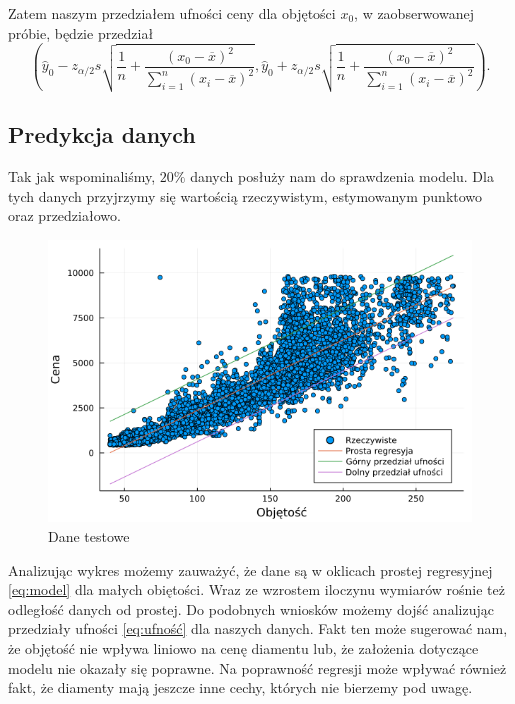 \documentclass[12pt]{article}
\theoremstyle{exer}
\begin{document}
	\noindent Zatem naszym przedziałem ufności ceny dla objętości $x_0$, w zaobserwowanej próbie, będzie przedział
	\begin{equation}\label{eq:ufność}
		\left(\hat y_0 - 	z_{\alpha/2}s\sqrt{\frac{1}{n}+\frac{\left(x_0-\overline{x}\right)^2}{\sum_{i=1}^n\left(x_i-\overline{x}\right)^2}}, \hat y_0 + z_{\alpha/2}s\sqrt{\frac{1}{n}+\frac{\left(x_0-\overline{x}\right)^2}{\sum_{i=1}^n\left(x_i-\overline{x}\right)^2}}\right).
	\end{equation}
     
     \subsection{Predykcja danych}
     Tak jak wspominaliśmy, $ 20\% $ danych posłuży nam do sprawdzenia modelu. Dla tych danych przyjrzymy się wartością rzeczywistym, estymowanym punktowo oraz przedziałowo.
     
     
	\begin{figure}[H]
	\centering
	\includegraphics[width=7\columnwidth/10]{images/prediction.png}
	\caption{Dane testowe}
	\label{fig:prediction}
\end{figure}
Analizując wykres możemy zauważyć, że dane są w oklicach prostej regresyjnej \eqref{eq:model} dla małych obiętości. Wraz ze wzrostem iloczynu wymiarów rośnie też odległość danych od prostej. Do podobnych wniosków możemy dojść analizując przedziały ufności \eqref{eq:ufność} dla naszych danych. Fakt ten może sugerować nam, że objętość nie wpływa liniowo na cenę diamentu lub, że założenia dotyczące modelu nie okazały się poprawne.
Na poprawność regresji może wpływać również fakt, że diamenty mają jeszcze inne cechy, których nie bierzemy pod uwagę.
\end{document}
